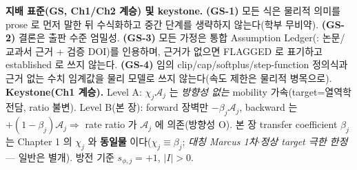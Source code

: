 \begin{groundingbox}
\textbf{지배 표준(GS, Ch1/Ch2 계승) 및 keystone.} \textbf{(GS-1)} 모든 식은 물리적 의미를 prose 로 먼저 말한 뒤
수식화하고 중간 단계를 생략하지 않는다(학부 무비약). \textbf{(GS-2)} 결론은 출판 수준 엄밀성. \textbf{(GS-3)} 모든
가정은 통합 Assumption Ledger(\AL{\#}: 논문/교과서 근거 + 검증 DOI)를 인용하며, 근거가 없으면 FLAGGED 로
표기하고 established 로 쓰지 않는다. \textbf{(GS-4)} 임의 clip/cap/softplus/step-function 정의식과 근거 없는
수치 임계값을 물리 모델로 쓰지 않는다(속도 제한은 물리적 병목으로). \textbf{Keystone(Ch1 계승).} Level A:
$\chi_j\mathcal A_j$ 는 \emph{방향성 없는} mobility 가속(target=열역학 전담, ratio 불변). Level B(본 장):
forward 장벽만 $-\beta_j\mathcal A_j$, backward 는 $+(1-\beta_j)\mathcal A_j\Rightarrow$ rate ratio 가
$\mathcal A_j$ 에 의존(방향성 O). 본 장 transfer coefficient $\beta_j$ 는 Chapter 1 의 $\chi_j$ 와 \textbf{동일물}
이다($\chi_j\equiv\beta_j$; \emph{대칭 Marcus 1차$\cdot$정상 target 극한 한정} — 일반은 별개). 방전 기준 $s_{\phi,j}=+1$, $|I|>0$.
\end{groundingbox}

